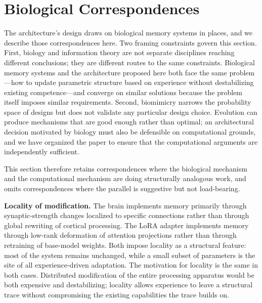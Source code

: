 \documentclass[11pt]{article}
\begin{document}
\section{Biological Correspondences}

The architecture's design draws on biological memory systems in places, and we describe those correspondences here. Two framing constraints govern this section. First, biology and information theory are not separate disciplines reaching different conclusions; they are different routes to the same constraints. Biological memory systems and the architecture proposed here both face the same problem---how to update parametric structure based on experience without destabilizing existing competence---and converge on similar solutions because the problem itself imposes similar requirements. Second, biomimicry narrows the probability space of designs but does not validate any particular design choice. Evolution can produce mechanisms that are good enough rather than optimal; an architectural decision motivated by biology must also be defensible on computational grounds, and we have organized the paper to ensure that the computational arguments are independently sufficient.

This section therefore retains correspondences where the biological mechanism and the computational mechanism are doing structurally analogous work, and omits correspondences where the parallel is suggestive but not load-bearing.

\textbf{Locality of modification.} The brain implements memory primarily through synaptic-strength changes localized to specific connections rather than through global rewriting of cortical processing. The LoRA adapter implements memory through low-rank deformation of attention projections rather than through retraining of base-model weights. Both impose locality as a structural feature: most of the system remains unchanged, while a small subset of parameters is the site of all experience-driven adaptation. The motivation for locality is the same in both cases. Distributed modification of the entire processing apparatus would be both expensive and destabilizing; locality allows experience to leave a structural trace without compromising the existing capabilities the trace builds on.
\end{document}
